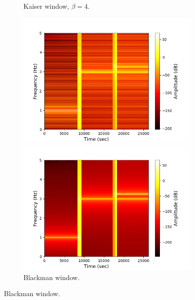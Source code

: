 \begin{figure}[H]
\begin{subfigure}{0.49\textwidth}
\caption{Kaiser window, $\beta=4$.}
\label{fig:stft_kaiser_10000_4}
\end{subfigure}
\begin{subfigure}{0.49\textwidth}
\centering
\includegraphics[width=\textwidth]{figures/stft_windows/bartlett_10000.png}
\caption{Bartlett window.}
\label{fig:stft_bartlett}
\includegraphics[width=\textwidth]{figures/stft_windows/blackman_10000.png}
\caption{Blackman window.}
\label{fig:stft_blackman}

\end{subfigure}
\end{figure}
